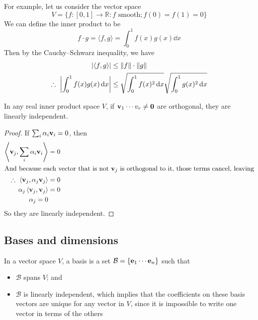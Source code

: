 For example, let us consider the vector space
\[
	V = \{ f: [0, 1] \to \mathbb R: f \text{ smooth}; f(0) = f(1) = 0 \}
\]
We can define the inner product to be
\[
	f \cdot g = \langle f, g \rangle = \int_0^1 f(x)g(x)\dd{x}
\]
Then by the Cauchy--Schwarz inequality, we have
\begin{align*}
	\abs{\langle f, g \rangle}               & \leq \norm{f} \cdot \norm{g}                                    \\
	\therefore\ \abs{\int_0^1 f(x)g(x)\dd{x}} & \leq \sqrt{\int_0^1 f(x)^2 \dd{x}}\sqrt{\int_0^1 g(x)^2 \dd{x}}
\end{align*}

\begin{lemma}
	In any real inner product space \(V\), if \(\vb v_1 \cdots v_r \neq \vb 0\) are orthogonal, they are linearly independent.
\end{lemma}
\begin{proof}
	If \(\sum_i \alpha_i \vb v_i = 0\), then
	\begin{align*}
		\left\langle \vb v_j, \sum_i \alpha_i \vb v_i \right\rangle     & = 0 \\
		\intertext{And because each vector that is not \(\vb v_j\) is orthogonal to it, those terms cancel, leaving}
		\therefore\ \left\langle \vb v_j, \alpha_j \vb v_j \right\rangle & = 0 \\
		\alpha_j \left\langle \vb v_j, \vb v_j \right\rangle            & = 0 \\
		\alpha_j = 0
	\end{align*}
	So they are linearly independent.
\end{proof}

\subsection{Bases and dimensions}
In a vector space \(V\), a basis is a set \(\mathcal B = \{ \vb e_1 \cdots \vb e_n \}\) such that
\begin{itemize}
	\item \(\mathcal B\) spans \(V\); and
	\item \(\mathcal B\) is linearly independent, which implies that the coefficients on these basis vectors are unique for any vector in \(V\), since it is impossible to write one vector in terms of the others
\end{itemize}


